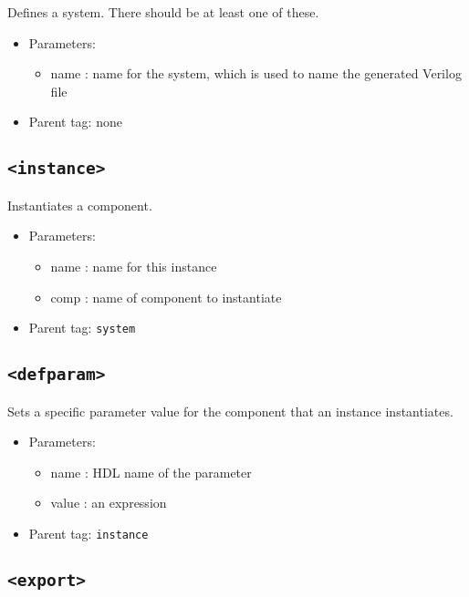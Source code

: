 \documentclass{article}
\begin{document}
Defines a system. There should be at least one of these.

\begin{itemize}
\item{Parameters:}
\begin{itemize}
\item{name : name for the system, which is used to name the generated Verilog file}
\end{itemize}
\item{Parent tag: none}
\end{itemize}

\subsection{\texttt{<instance>}}

Instantiates a component.

\begin{itemize}
\item{Parameters:}
\begin{itemize}
\item{name : name for this instance}
\item{comp : name of component to instantiate}
\end{itemize}
\item{Parent tag: \texttt{system}}
\end{itemize}

\subsection{\texttt{<defparam>}}

Sets a specific parameter value for the component that an instance instantiates.

\begin{itemize}
\item{Parameters:}
\begin{itemize}
\item{name : HDL name of the parameter}
\item{value : an expression}
\end{itemize}
\item{Parent tag: \texttt{instance}}
\end{itemize}

\subsection{\texttt{<export>}}
\end{document}
